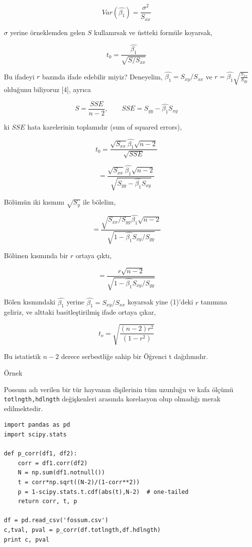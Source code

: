 \documentclass[12pt,fleqn]{article}\usepackage{../../common}
\begin{document}
$$ Var(\hat{\beta_1}) = \frac{\sigma^2}{S_{xx}} $$

$\sigma$ yerine örneklemden gelen $S$ kullanırsak ve üstteki formüle koyarsak,

$$ t_0 = \frac{\hat{\beta_1}}{\sqrt{S / S_{xx}}} $$

Bu ifadeyi $r$ bazında ifade edebilir miyiz?  Deneyelim, $\hat{\beta_1} =
S_{xy} / S_{xx}$ ve $r = \hat{\beta_1}\sqrt{\frac{S_{xx}}{S_{yy}}}$ olduğunu
biliyoruz [4], ayrıca

$$ S = \frac{SSE}{n-2}, \qquad SSE = S_{yy} - \hat{\beta_1} S_{xy} $$

ki $SSE$ hata karelerinin toplamıdır (sum of squared errors),

$$ t_0 = \frac{  \sqrt{S_{xx}} \hat{\beta_1} \sqrt{n-2} }{\sqrt{SSE}} $$

$$ = \frac{  \sqrt{S_{xx}} \hat{\beta_1} \sqrt{n-2} }{\sqrt{S_{yy} - \hat{\beta_1} S_{xy}}} $$

Bölümün iki kısmını $\sqrt{S_y}$ ile bölelim, 

$$ = 
\frac{ \sqrt{S_{xx}/S_{yy}} \hat{\beta_1} \sqrt{n-2} }
{\sqrt{1 - \hat{\beta_1} S_{xy}/S_{yy}}} 
$$

Bölünen kısmında bir $r$ ortaya çıktı,

$$ = 
\frac{ r\sqrt{n-2} }
{\sqrt{1 - \hat{\beta_1} S_{xy}/S_{yy}}} 
$$

Bölen kısmındaki $\hat{\beta_1}$ yerine $\hat{\beta_1} = S_{xy} / S_{xx}$
koyarsak yine (1)'deki $r$ tanımına geliriz, ve alttaki basitleştirilmiş
ifade ortaya çıkar,

$$ t_o = \sqrt{\frac{(n-2)r^2}{(1-r^2)}} $$

Bu istatistik $n-2$ derece serbestliğe sahip bir Öğrenci t dağılımıdır. 

Örnek

Possum adı verilen bir tür hayvanın dişilerinin tüm uzunluğu ve kafa ölçümü
\verb!totlngth,hdlngth! değişkenleri arasında korelasyon olup olmadığı
merak edilmektedir.

\begin{verbatim}
import pandas as pd
import scipy.stats

def p_corr(df1, df2):
    corr = df1.corr(df2)
    N = np.sum(df1.notnull())
    t = corr*np.sqrt((N-2)/(1-corr**2))
    p = 1-scipy.stats.t.cdf(abs(t),N-2)  # one-tailed
    return corr, t, p

df = pd.read_csv('fossum.csv')
c,tval, pval = p_corr(df.totlngth,df.hdlngth)
print c, pval
\end{verbatim}
\end{document}
